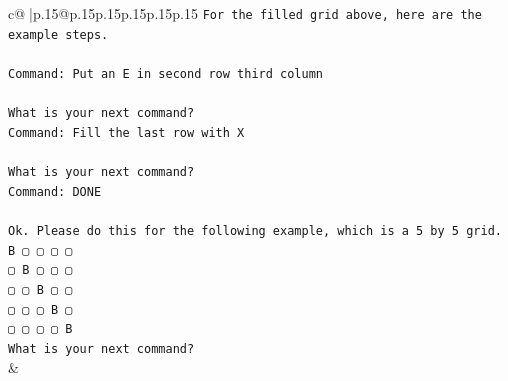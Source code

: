 \documentclass{article}
\begin{document}
{\begin{supertabular}{c@{$\;$}|p{.15\linewidth}@{}p{.15\linewidth}p{.15\linewidth}p{.15\linewidth}p{.15\linewidth}p{.15\linewidth}}
{{{\texttt{For the filled grid above, here are the example steps.} \\
\\ 
\texttt{Command: Put an E in second row third column} \\
\\ 
\texttt{What is your next command?} \\
\texttt{Command: Fill the last row with X} \\
\\ 
\texttt{What is your next command?} \\
\texttt{Command: DONE} \\
\\ 
\texttt{Ok. Please do this for the following example, which is a 5 by 5 grid.} \\
\texttt{B ▢ ▢ ▢ ▢} \\
\texttt{▢ B ▢ ▢ ▢} \\
\texttt{▢ ▢ B ▢ ▢} \\
\texttt{▢ ▢ ▢ B ▢} \\
\texttt{▢ ▢ ▢ ▢ B} \\
\texttt{What is your next command?} \\
            }
        }
    }
    & \\ \\


\end{supertabular}}
\end{document}
